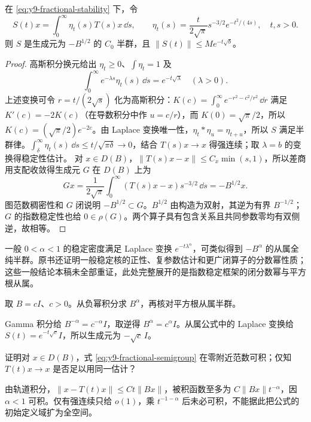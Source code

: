 \begin{proposition}[平方根的从属半群]\label{prop:y9-square-root-subordination}
在 \eqref{eq:y9-fractional-stability} 下，令
\begin{equation}\label{eq:y9-subordination}
 S(t)x=\int_0^\infty\eta_t(s)T(s)x\,\dd s,\qquad
 \eta_t(s)=\frac{t}{2\sqrt\pi}s^{-3/2}e^{-t^2/(4s)},\quad t,s>0.
\end{equation}
则 $S$ 是生成元为 $-B^{1/2}$ 的 $C_0$ 半群，且 $\|S(t)\|\le Me^{-t\sqrt b}$。
\end{proposition}
\begin{proof}
高斯积分换元给出 $\eta_t\ge0$、$\int\eta_t=1$ 及
\[
 \int_0^\infty e^{-\lambda s}\eta_t(s)\,\dd s=e^{-t\sqrt\lambda}\quad(\lambda>0).
\]
上述变换可令 $r=t/(2\sqrt s)$ 化为高斯积分：$K(c)=\int_0^\infty e^{-r^2-c^2/r^2}\,\dd r$ 满足 $K'(c)=-2K(c)$（在导数积分中作 $u=c/r$），而 $K(0)=\sqrt\pi/2$，所以 $K(c)=(\sqrt\pi/2)e^{-2c}$。由 Laplace 变换唯一性，$\eta_t*\eta_u=\eta_{t+u}$，所以 $S$ 满足半群律。$\int_\delta^\infty\eta_t(s)\,\dd s\le t/\sqrt{\pi\delta}\to0$，结合 $T(s)x\to x$ 得强连续；取 $\lambda=b$ 的变换得稳定性估计。
对 $x\in D(B)$，$\|T(s)x-x\|\le C_x\min(s,1)$，所以差商用支配收敛得生成元 $G$ 在 $D(B)$ 上为
\[
 Gx=\frac1{2\sqrt\pi}\int_0^\infty (T(s)x-x)s^{-3/2}\,\dd s=-B^{1/2}x.
\]
图范数稠密性和 $G$ 闭说明 $-B^{1/2}\subset G$。$B^{1/2}$ 由构造为双射，其逆为有界 $B^{-1/2}$；$G$ 的指数稳定性也给 $0\in\rho(G)$。两个算子具有包含关系且共同参数零均有双侧逆，故相等。
\end{proof}

一般 $0<\alpha<1$ 的稳定密度满足 Laplace 变换 $e^{-t\lambda^\alpha}$，可类似得到 $-B^\alpha$ 的从属全纯半群。原书还证明一般稳定核的正性、复参数估计和更广闭算子的分数幂性质；这些一般结论本稿未全部重证，此处完整展开的是指数稳定框架的闭分数幂与平方根从属。

\begin{exercise}[标量分数幂]\label{ex:y9-fractional-scalar}
取 $B=cI$、$c>0$。从负幂积分求 $B^\alpha$，再核对平方根从属半群。
\end{exercise}
\begin{solution}
Gamma 积分给 $B^{-\alpha}=c^{-\alpha}I$，取逆得 $B^\alpha=c^\alpha I$。从属公式中的 Laplace 变换给 $S(t)=e^{-t\sqrt c}I$，所以生成元为 $-\sqrt c\,I$。
\end{solution}

\begin{exercise}[零点处的积分条件]\label{ex:y9-fractional-integrability}
证明对 $x\in D(B)$，式 \eqref{eq:y9-fractional-semigroup} 在零附近范数可积；仅知 $T(t)x\to x$ 是否足以用同一估计？
\end{exercise}
\begin{solution}
由轨道积分，$\|x-T(t)x\|\le Ct\|Bx\|$，被积函数至多为 $C\|Bx\|t^{-\alpha}$，因 $\alpha<1$ 可积。仅有强连续只给 $o(1)$，乘 $t^{-1-\alpha}$ 后未必可积，不能据此把公式的初始定义域扩为全空间。
\end{solution}

